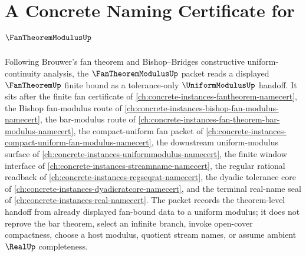 \chapter{A Concrete Naming Certificate for $\FanTheoremModulusUp$}
\label{ch:concrete-instances-fan-theorem-modulus-namecert}

Following Brouwer's fan theorem and Bishop--Bridges constructive uniform-continuity analysis, the $\FanTheoremModulusUp$ packet reads a displayed $\FanTheoremUp$ finite bound as a tolerance-only $\UniformModulusUp$ handoff. It sits after the finite fan certificate of \autoref{ch:concrete-instances-fantheorem-namecert}, the Bishop fan-modulus route of \autoref{ch:concrete-instances-bishop-fan-modulus-namecert}, the bar-modulus route of \autoref{ch:concrete-instances-fan-theorem-bar-modulus-namecert}, the compact-uniform fan packet of \autoref{ch:concrete-instances-compact-uniform-fan-modulus-namecert}, the downstream uniform-modulus surface of \autoref{ch:concrete-instances-uniformmodulus-namecert}, the finite window interface of \autoref{ch:concrete-instances-streamname-namecert}, the regular rational readback of \autoref{ch:concrete-instances-regseqrat-namecert}, the dyadic tolerance core of \autoref{ch:concrete-instances-dyadicratcore-namecert}, and the terminal real-name seal of \autoref{ch:concrete-instances-real-namecert}. The packet records the theorem-level handoff from already displayed fan-bound data to a uniform modulus; it does not reprove the bar theorem, select an infinite branch, invoke open-cover compactness, choose a host modulus, quotient stream names, or assume ambient $\RealUp$ completeness.

